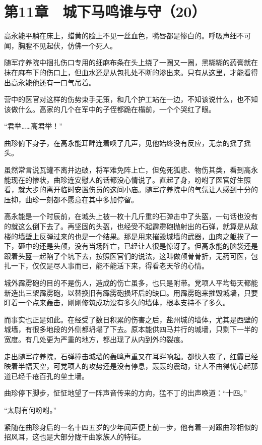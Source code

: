 \section{第11章　城下马鸣谁与守（20）}

高永能平躺在床上，蜡黄的脸上不见一丝血色，嘴唇都是惨白的。呼吸声细不可闻，胸膛不见起伏，仿佛一个死人。

随军疗养院中捆扎伤口专用的细麻布条在头上绕了一圈又一圈，黑糊糊的药膏就在抹在麻布下的伤口上，但血水还是从包扎处不断的渗出来。只有从这里，才能看得出高永能他还有一口气吊着。

营中的医官对这样的伤势束手无策，和几个护工站在一边，不知该说什么，也不知该做什么。高家的几个在军中的子侄都跪在榻前，一个个哭红了眼。

“君举……高君举！”

曲珍俯下身子，在高永能耳畔连着唤了几声，见他始终没有反应，无奈的摇了摇头。

虽然常言说瓦罐不离井边破，将军难免阵上亡，但兔死狐悲、物伤其类，看到高永能现在的惨状，曲珍连安慰人的话都没心情说了。直起了身，吩咐了医官好生照看，就大步的离开临时安置伤员的这间小庙。随军疗养院中的气氛让人感到十分的压抑，曲珍一刻都不愿意在其中多加停留。

高永能是一个时辰前，在城头上被一枚十几斤重的石弹击中了头盔，一句话也没有的就这么倒下去了。再坚固的头盔，也经受不起霹雳砲抛射出的石弹，就算是从敌楼的墙壁上反弹过来的也是一个结果。那是用来摧毁城墙的武器，血肉之躯挨了一下，砸中的还是头颅，没有当场阵亡，已经让人很是惊讶了。但高永能的脑袋还是跟着头盔一起陷了个坑下去，按照医官们的说法，这叫做颅骨骨折，无药可医，包扎一下，仅仅是尽人事而已，能不能活下来，得看老天爷的心情。

城外霹雳砲的目的不是伤人，造成的伤亡虽多，也只是附带。党项人平均每天都能新造出三架霹雳砲，以替换旧有霹雳砲损坏后的缺口。用霹雳砲来摧毁城墙，只要盯着一个点来轰击，刚刚修筑成功没有多久的墙体，根本支持不了多久。

而事实也正是如此。在经受了数日积累的伤害之后，盐州城的墙体，尤其是西壁的城墙，有很多地段的外侧都坍塌了下去。原本能供四马并行的城墙，只剩下一半的宽度。有几处更为严重的地方，都出现了从内到外的裂痕。

走出随军疗养院，石弹撞击城墙的轰鸣声重又在耳畔响起。都快入夜了，红霞已经映着半幅天空，可党项人的攻势还是没有停息，轰轰的震动，让人不由得忧心起那道已经千疮百孔的垒土墙。

曲珍停下脚步，怔怔地望了一阵声音传来的方向，猛不丁的出声唤道：“十四。”

“太尉有何吩咐。”

紧随在曲珍身后的一名十四五岁的少年闻声便上前一步，他有着一对跟曲珍相似的招风耳，这也是大部分陇干曲家族人的特征。

